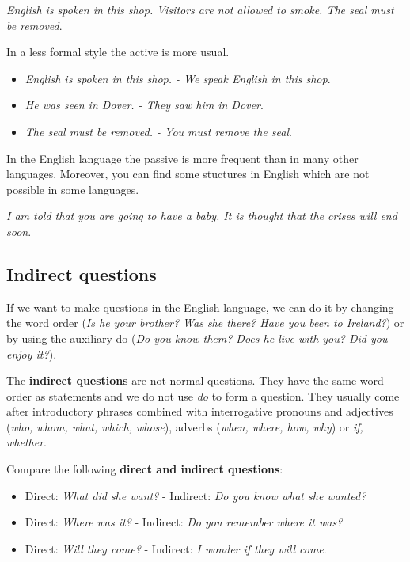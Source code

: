 \textit{English is spoken in this shop. Visitors are not allowed to smoke. The seal must be removed}.

In a less formal style the active is more usual.  

\begin{itemize}
\item \textit{English is spoken in this shop. - We speak English in this shop}.
\item \textit{He was seen in Dover. - They saw him in Dover}.
\item \textit{The seal must be removed. - You must remove the seal}.
\end{itemize}

In the English language the passive is more frequent than in many other languages. Moreover, you can find some stuctures in English which are not possible in some languages.

\textit{I am told that you are going to have a baby. It is thought that the crises will end soon}.

\subsection{Indirect questions} 

If we want to make questions in the English language, we can do it by changing the word order (\textit{Is he your brother? Was she there? Have you been to Ireland?}) or by using the auxiliary do (\textit{Do you know them? Does he live with you? Did you enjoy it?}). 

The \textbf{indirect questions} are not normal questions. They have the same word order as statements and we do not use \textit{do} to form a question. They usually come after introductory phrases combined with interrogative pronouns and adjectives (\textit{who, whom, what, which, whose}), adverbs (\textit{when, where, how, why}) or \textit{if, whether}.

Compare the following \textbf{direct and indirect questions}:

\begin{itemize}

\item Direct: \textit{What did she want?} - Indirect: \textit{Do you know what she wanted?}
\item Direct: \textit{Where was it?} - Indirect: \textit{Do you remember where it was?}
\item Direct: \textit{Will they come?} - Indirect: \textit{I wonder if they will come}.

\end{itemize}

